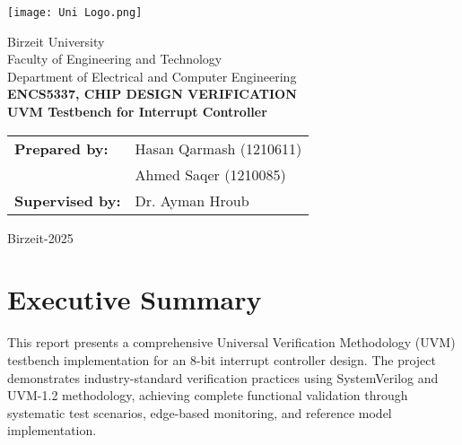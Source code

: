 \documentclass[12pt,a4paper]{article}
\begin{document}
\begin{titlepage}
    \begin{center}
        \vspace*{1cm}
        \texttt{[image: Uni Logo.png]}
        
        \vspace{2cm}
        \large
        Birzeit University\\
        Faculty of Engineering and Technology\\
        Department of Electrical and Computer Engineering\\
\vspace{0.5cm}
\textbf{   \Large   ENCS5337, CHIP DESIGN VERIFICATION}
        \vspace{1.5cm}
        \Large
        \textbf{ \\UVM Testbench for Interrupt Controller\\ }


            
        \vspace{1cm}
    \begin{tabular}{ll}
        \textbf{Prepared by:} & Hasan Qarmash (1210611) \\
                             &  Ahmed Saqer (1210085) \\[1cm]
        \textbf{Supervised by:} & Dr.  Ayman Hroub
    \end{tabular}
     
     
            
        \vfill
        \normalsize

        \vspace{1cm}
        Birzeit-2025
            
        \vspace{0.8cm}
            
        
            

            
    \end{center}
\end{titlepage}







\tableofcontents
\newpage

\listoffigures
\newpage

\listoftables
\newpage

\section{Executive Summary}
This report presents a comprehensive Universal Verification Methodology (UVM) testbench implementation for an 8-bit interrupt controller design. The project demonstrates industry-standard verification practices using SystemVerilog and UVM-1.2 methodology, achieving complete functional validation through systematic test scenarios, edge-based monitoring, and reference model implementation.
\end{document}
